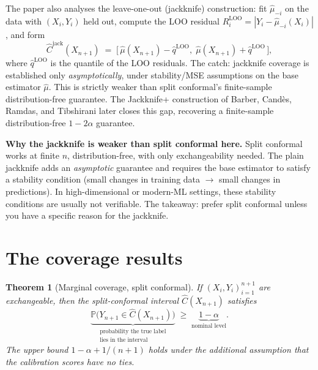 \documentclass[letterpaper,11pt,leqno]{article}
\newtheorem*{thmstar}{Theorem}
\begin{document}
The paper also analyses the leave-one-out (jackknife) construction: fit $\hat{\mu}_{-i}$ on the data with $(X_i, Y_i)$ held out, compute the LOO residual $R_i^{\text{LOO}} = |Y_i - \hat{\mu}_{-i}(X_i)|$, and form
\begin{equation*}
\hat{C}^{\text{jack}}(X_{n+1})
\;=\;
\bigl[\,\hat{\mu}(X_{n+1}) - \hat{q}^{\text{LOO}},\; \hat{\mu}(X_{n+1}) + \hat{q}^{\text{LOO}}\,\bigr],
\end{equation*}
where $\hat{q}^{\text{LOO}}$ is the quantile of the LOO residuals. The catch: jackknife coverage is established only \emph{asymptotically}, under stability/MSE assumptions on the base estimator $\hat{\mu}$. This is strictly weaker than split conformal's finite-sample distribution-free guarantee. The Jackknife+ construction of Barber, Cand\`es, Ramdas, and Tibshirani \cite{barber2021jackknifeplus} later closes this gap, recovering a finite-sample distribution-free $1 - 2\alpha$ guarantee.

\begin{assumptionexplain}
\textbf{Why the jackknife is weaker than split conformal here.} Split conformal works at finite $n$, distribution-free, with only exchangeability needed. The plain jackknife adds an \emph{asymptotic} guarantee and requires the base estimator to satisfy a stability condition (small changes in training data $\to$ small changes in predictions). In high-dimensional or modern-ML settings, these stability conditions are usually not verifiable. The takeaway: prefer split conformal unless you have a specific reason for the jackknife.
\end{assumptionexplain}

\section{The coverage results}\label{s:result}

\begin{thmstar}[Marginal coverage, split conformal]
If $(X_i, Y_i)_{i=1}^{n+1}$ are exchangeable, then the split-conformal interval $\hat{C}(X_{n+1})$ satisfies
\begin{equation*}
\underbrace{\mathbb{P}\bigl(Y_{n+1} \in \hat{C}(X_{n+1})\bigr)}_{\substack{\text{probability the true label}\\\text{lies in the interval}}}
\;\geq\;
\underbrace{1 - \alpha}_{\text{nominal level}}.
\end{equation*}
The upper bound $1 - \alpha + 1/(n+1)$ holds under the additional assumption that the calibration scores have no ties.
\end{thmstar}
\end{document}
